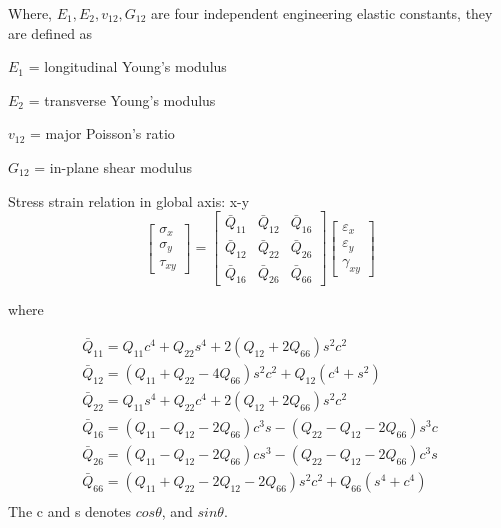 \documentclass[Afour,sagev,times]{sagej}
\begin{document}
Where, $E_1, E_2, v_{12}, G_{12}$ are four independent engineering elastic constants, they are
defined as 

$E_1$ = longitudinal Young's modulus

$E_2$ = transverse  Young's modulus

$v_{12}$ = major Poisson's ratio

$G_{12}$ = in-plane shear modulus 

Stress strain relation in global axis: x-y 
\begin{equation}
	\left[\begin{array}{l}\sigma_{x} \\ \sigma_{y} \\ \tau_{x
			y}\end{array}\right]=\left[\begin{array}{lll}\bar{Q}_{11} & \bar{Q}_{12} & \bar{Q}_{16}
			\\ \bar{Q}_{12} & \bar{Q}_{22} & \bar{Q}_{26} \\ \bar{Q}_{16} & \bar{Q}_{26} &
			\bar{Q}_{66}\end{array}\right]\left[\begin{array}{l}\varepsilon_{x} \\ \varepsilon_{y}
	\\ \gamma_{x y}\end{array}\right]
\end{equation}

where

\begin{equation}
	\begin{array}{l}
		\bar{Q}_{11}=Q_{11} c^{4}+Q_{22} s^{4}+2\left(Q_{12}+2 Q_{66}\right) s^{2} c^{2}
		\\ 
		\bar{Q}_{12}=\left(Q_{11}+Q_{22}-4 Q_{66}\right) s^{2} c^{2}+Q_{12}\left(c^{4}+s^{2}\right)
		\\ 
		\bar{Q}_{22}=Q_{11} s^{4}+Q_{22} c^{4}+2\left(Q_{12}+2 Q_{66}\right) s^{2} c^{2} \\

		\bar{Q}_{16}=\left(Q_{11}-Q_{12}-2 Q_{66}\right) c^{3} s-\left(Q_{22}-Q_{12}-2
			Q_{66}\right) s^{3} c \\ 
		\bar{Q}_{26}=\left(Q_{11}-Q_{12}-2 Q_{66}\right) c s^{3}-\left(Q_{22}-Q_{12}-2 Q_{66}\right)
		c^{3} s \\ 
		\bar{Q}_{66}=\left(Q_{11}+Q_{22}-2 Q_{12}-2 Q_{66}\right) s^{2}
		c^{2}+Q_{66}\left(s^{4}+c^{4}\right)\\
	\end{array}
\end{equation}
The c and s denotes $cos\theta$, and $sin\theta$. 
\end{document}

